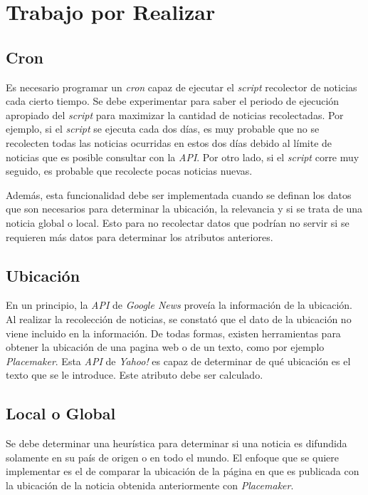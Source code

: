\documentclass[10pt]{article}
\begin{document}
\section{Trabajo por Realizar}

\subsection{Cron}

	Es necesario programar un \emph{cron} capaz de ejecutar el \emph{script} recolector de noticias cada cierto tiempo. Se debe experimentar para saber el periodo de ejecución apropiado del \emph{script} para maximizar la cantidad de noticias recolectadas. Por ejemplo, si el \emph{script} se ejecuta cada dos días, es muy probable que no se recolecten todas las noticias ocurridas en estos dos días debido al límite de noticias que es posible consultar con la \emph{API}. Por otro lado, si el \emph{script} corre muy seguido, es probable que recolecte pocas noticias nuevas.
	
	Además, esta funcionalidad debe ser implementada cuando se definan los datos que son necesarios para determinar la ubicación, la relevancia y si se trata de una noticia global o local. Esto para no recolectar datos que podrían no servir si se requieren más datos para determinar los atributos anteriores.

\subsection{Ubicación}

	En un principio, la \emph{API} de \emph{Google News} proveía la información de la ubicación. Al realizar la recolección de noticias, se constató que el dato de la ubicación no viene incluido en la información. De todas formas, existen herramientas para obtener la ubicación de una pagina web o de un texto, como por ejemplo \emph{Placemaker}. Esta \emph{API} de \emph{Yahoo!} es capaz de determinar de qué ubicación es el texto que se le introduce. Este atributo debe ser calculado.

\subsection{Local o Global}

	Se debe determinar una heurística para determinar si una noticia es difundida solamente en su país de origen o en todo el mundo. El enfoque que se quiere implementar es el de comparar la ubicación de la página en que es publicada con la ubicación de la noticia obtenida anteriormente con \emph{Placemaker}.
\end{document}
